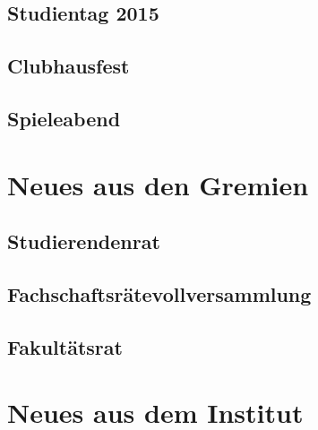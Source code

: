 \documentclass[12pt, a4paper]{article}
\begin{document}
\subsection{Studientag 2015}


\subsection{Clubhausfest}


\subsection{Spieleabend}


\newpage
\section{Neues aus den Gremien}


\subsection{Studierendenrat}

\subsection{Fachschaftsrätevollversammlung}

\subsection{Fakultätsrat}

\newpage
\section{Neues aus dem Institut}
\end{document}
